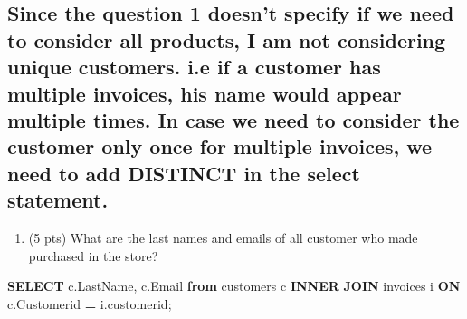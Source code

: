 \documentclass[
]{article}
\newenvironment{Shaded}{\begin{snugshade}}{\end{snugshade}}
\newcommand{\KeywordTok}[1]{\textcolor[rgb]{0.13,0.29,0.53}{\textbf{#1}}}
\newcommand{\NormalTok}[1]{#1}
\newcommand{\OperatorTok}[1]{\textcolor[rgb]{0.81,0.36,0.00}{\textbf{#1}}}
\providecommand{\tightlist}{%
  \setlength{\itemsep}{0pt}\setlength{\parskip}{0pt}}
\begin{document}
\hypertarget{since-the-question-1-doesnt-specify-if-we-need-to-consider-all-products-i-am-not-considering-unique-customers.-i.e-if-a-customer-has-multiple-invoices-his-name-would-appear-multiple-times.-in-case-we-need-to-consider-the-customer-only-once-for-multiple-invoices-we-need-to-add-distinct-in-the-select-statement.}{%
\subsection{Since the question 1 doesn't specify if we need to consider
all products, I am not considering unique customers. i.e if a customer
has multiple invoices, his name would appear multiple times. In case we
need to consider the customer only once for multiple invoices, we need
to add DISTINCT in the select
statement.}\label{since-the-question-1-doesnt-specify-if-we-need-to-consider-all-products-i-am-not-considering-unique-customers.-i.e-if-a-customer-has-multiple-invoices-his-name-would-appear-multiple-times.-in-case-we-need-to-consider-the-customer-only-once-for-multiple-invoices-we-need-to-add-distinct-in-the-select-statement.}}

\begin{enumerate}
\def\labelenumi{\arabic{enumi}.}
\tightlist
\item
  (5 pts) What are the last names and emails of all customer who made
  purchased in the store?
\end{enumerate}

\begin{Shaded}
\begin{Highlighting}[]

\KeywordTok{SELECT}\NormalTok{ c.LastName, c.Email }
\KeywordTok{from}\NormalTok{ customers c }\KeywordTok{INNER} \KeywordTok{JOIN}\NormalTok{ invoices i }
\KeywordTok{ON}\NormalTok{ c.Customerid }\OperatorTok{=}\NormalTok{ i.customerid;   }
\end{Highlighting}
\end{Shaded}
\end{document}
